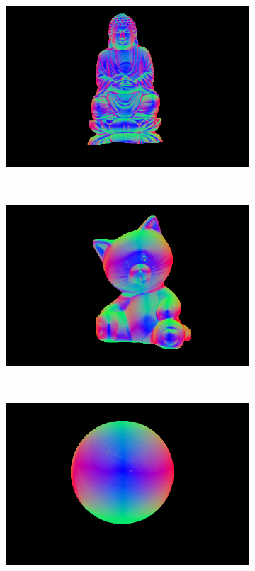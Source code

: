 \documentclass{paper}
\begin{document}
\begin{figure}[h!]
        \centering
        \begin{subfigure}{0.3\textwidth}
                \includegraphics[width=\textwidth]{report_fig/buddha_n}
        \end{subfigure}
        ~ 
        \begin{subfigure}{0.3\textwidth}
                \includegraphics[width=\textwidth]{report_fig/cat_n}
        \end{subfigure}
        ~ 
        \begin{subfigure}{0.3\textwidth}
                \includegraphics[width=\textwidth]{report_fig/gray_n}

\end{subfigure}
\end{figure}
\end{document}
